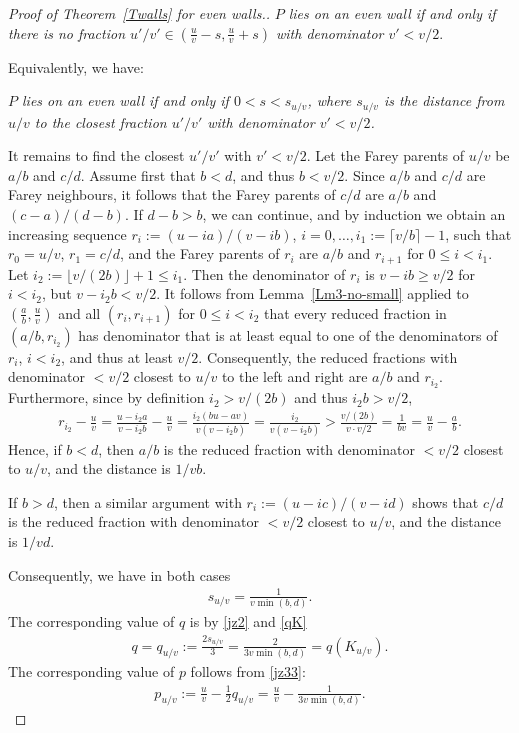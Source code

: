 \documentclass[11pt,reqno,tbtags,a4paper]{amsart}
\numberwithin{equation}{section}
\renewcommand\le{\leq}
\renewcommand\ge{\geq}
\renewcommand\leq{\leqslant}
\renewcommand\geq{\geqslant}
\theoremstyle{plain}%
\theoremstyle{definition}
\theoremstyle{remark}
\newcounter{cases}
\newcommand{\refT}[1]{Theorem~\ref{#1}}
\newcommand{\refL}[1]{Lemma~\ref{#1}}
\newcommand\ceil[1]{\lceil#1\rceil}
\newcommand\floor[1]{\lfloor#1\rfloor}
\newcommand\uv{_{u/v}}
\newcommand\0{{\boldsymbol 0}}
\newcommand\1{{\boldsymbol 1}}
\begin{document}
\begin{proof}[Proof of \refT{Twalls} for even walls.]
\emph{$P$ lies on an even wall if and only if 
there is no fraction $u'/v'\in(\tfrac uv -s,\tfrac uv+s)$ with denominator
$v'<v/2$}.

Equivalently, we have:

\emph{$P$ lies on an even wall if and only if $0<s<s\uv$, where
$s\uv$ is the distance from $u/v$ to the closest fraction $u'/v'$ with
denominator $v'<v/2$.}

It remains to find the closest $u'/v'$ with $v'<v/2$.
Let the Farey parents of $u/v$ be $a/b$ and $c/d$.
Assume first that $b<d$, and thus $b<v/2$. 
Since $a/b$ and $c/d$ are Farey neighbours, it
follows that the Farey parents of $c/d$ are $a/b$ and $(c-a)/(d-b)$.
If $d-b>b$, we can continue, and by induction we obtain an increasing
sequence $r_i:=(u-ia)/(v-ib)$, $i=0,\dots,i_1:=\ceil{v/b}-1$, such that
$r_0=u/v$, $r_1=c/d$, and 
the Farey parents of $r_i$ are $a/b$ and $r_{i+1}$ for $0\le i<i_1$.
Let $i_2:=\floor{v/(2b)}+1\le i_1$. Then the denominator of $r_i$ is
$v-ib\ge v/2$ for $i<i_2$, but $v-i_2b<v/2$.
It follows from \refL{Lm3-no-small} applied to
$(\frac{a}{b},\frac{u}{v})$ and all $(r_i,r_{i+1})$ for $0\le i< i_2$
that every reduced fraction in
$(a/b,r_{i_2})$ has denominator that is at least equal to one of the
denominators of $r_i$, $i< i_2$, and thus at least $v/2$.
Consequently, the reduced fractions with denominator $<v/2$ closest to $u/v$
to the left and right are $a/b$ and $r_{i_2}$.
Furthermore, since by definition $i_2>v/(2b)$ and thus $i_2b>v/2$, 
\begin{align}\label{vc1}
  r_{i_2}-\frac{u}v 
= \frac{u-i_2a}{v-i_2b}-\frac{u}v
=\frac{i_2(bu-av)}{v(v-i_2b)}
=\frac{i_2}{v(v-i_2b)}
>\frac{v/(2b)}{v\cdot v/2}
=\frac1{bv}
=\frac{u}v-\frac{a}b.
\end{align}
Hence, if $b<d$, then $a/b$ is the reduced fraction with denominator $<v/2$
closest to $u/v$, and the distance is $1/vb$.

If $b>d$, then 
a similar argument with $r_i:=(u-ic)/(v-id)$ shows that
$c/d$ is the reduced fraction with denominator
$<v/2$ 
closest to $u/v$, and the distance is $1/vd$.

Consequently, we have in both cases
\begin{align}\label{vc2}
  s\uv=\frac{1}{v\min(b,d)}.
\end{align}
The corresponding value of $q$ is by \eqref{jz2} and \eqref{qK}
\begin{align}\label{vc3}
q= q\uv :=\frac{2s\uv}{3}
=\frac{2}{3v\min(b,d)}
=q(K\uv).
\end{align}
The corresponding value of $p$ follows from \eqref{jz33}:
\begin{align}\label{vc4}
p\uv :=\frac{u}v -\frac12q\uv
=\frac{u}v - \frac{1}{3v\min(b,d)}
.\end{align}



\end{proof}
\end{document}
